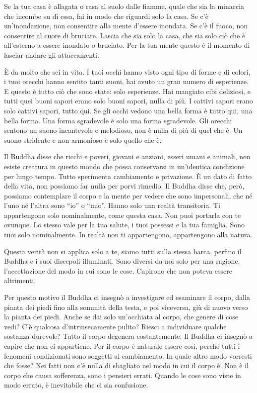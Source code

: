 Se la tua casa è allagata o rasa al suolo dalle fiamme, quale che sia la
minaccia che incombe su di essa, fai in modo che riguardi solo la casa.
Se c'è un'inondazione, non consentire alla mente d'essere inondata. Se
c'è il fuoco, non consentire al cuore di bruciare. Lascia che sia solo
la casa, che sia solo ciò che è all'esterno a essere inondato o
bruciato. Per la tua mente questo è il momento di lasciar andare gli
attaccamenti.

È da molto che sei in vita. I tuoi occhi hanno visto ogni tipo di forme
e di colori, i tuoi orecchi hanno sentito tanti suoni, hai avuto un gran
numero di esperienze. E questo è tutto ciò che sono state: solo
esperienze. Hai mangiato cibi deliziosi, e tutti quei buoni sapori erano
solo buoni sapori, nulla di più. I cattivi sapori erano solo cattivi
sapori, tutto qui. Se gli occhi vedono una bella forma è tutto qui, una
bella forma. Una forma sgradevole è solo una forma sgradevole. Gli
orecchi sentono un suono incantevole e melodioso, non è nulla di più di
quel che è. Un suono stridente e non armonioso è solo quello che è.

Il Buddha disse che ricchi e poveri, giovani e anziani, esseri umani e
animali, non esiste creatura in questo mondo che possa conservarsi in
un'identica condizione per lungo tempo. Tutto sperimenta cambiamento e
privazione. È un dato di fatto della vita, non possiamo far nulla per
porvi rimedio. Il Buddha disse che, però, possiamo contemplare il corpo
e la mente per vedere che sono impersonali, che né l'uno né l'altra sono
``io'' o ``mio''. Hanno solo una realtà transitoria. Ti appartengono
solo nominalmente, come questa casa. Non puoi portarla con te ovunque.
Lo stesso vale per la tua salute, i tuoi possessi e la tua famiglia.
Sono tuoi solo nominalmente. In realtà non ti appartengono, appartengono
alla natura.

Questa verità non si applica solo a te, siamo tutti sulla stessa barca,
perfino il Buddha e i suoi discepoli illuminati. Sono diversi da noi
solo per una ragione, l'accettazione del modo in cui sono le cose.
Capirono che non poteva essere altrimenti.

Per questo motivo il Buddha ci insegnò a investigare ed esaminare il
corpo, dalla pianta dei piedi fino alla sommità della testa, e poi
viceversa, giù di nuovo verso la pianta dei piedi. Anche se dai solo
un'occhiata al corpo, che genere di cose vedi? C'è qualcosa
d'intrinsecamente pulito? Riesci a individuare qualche sostanza
durevole? Tutto il corpo degenera costantemente. Il Buddha ci insegnò a
capire che non ci appartiene. Per il corpo è naturale essere così,
perché tutti i fenomeni condizionati sono soggetti al cambiamento. In
quale altro modo vorresti che fosse? Nei fatti non c'è nulla di
sbagliato nel modo in cui il corpo è. Non è il corpo che causa
sofferenza, sono i pensieri errati. Quando le cose sono viste in modo
errato, è inevitabile che ci sia confusione.

